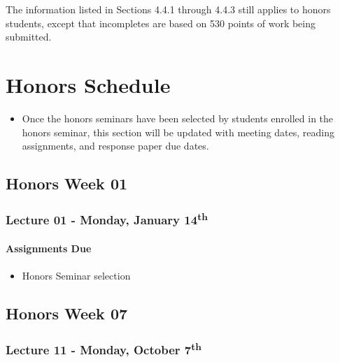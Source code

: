 \documentclass[]{book}
\providecommand{\tightlist}{%
  \setlength{\itemsep}{0pt}\setlength{\parskip}{0pt}}
\newenvironment{rmdblock}[1]
  {\begin{shaded*}
  \begin{itemize}
  \renewcommand{\labelitemi}{
    \raisebox{-.7\height}[0pt][0pt]{
      {\setkeys{Gin}{width=3em,keepaspectratio}\texttt{[image: images/\#1]}}
    }
  }
  \item
  }
  {
  \end{itemize}
  \end{shaded*}
  }
\newenvironment{rmdwarning}
  {\begin{rmdblock}{warning}}
  {\end{rmdblock}}
\begin{document}
The information listed in Sections 4.4.1 through 4.4.3 still applies to honors students, except that incompletes are based on 530 points of work being submitted.

\hypertarget{honors-schedule}{%
\chapter{Honors Schedule}\label{honors-schedule}}

\begin{rmdwarning}
Once the honors seminars have been selected by students enrolled in the
honors seminar, this section will be updated with meeting dates, reading
assignments, and response paper due dates.
\end{rmdwarning}

\hypertarget{honors-week-01}{%
\section*{Honors Week 01}\label{honors-week-01}}

\hypertarget{lecture-01---monday-january-14th}{%
\subsection*{\texorpdfstring{Lecture 01 - Monday, January 14\textsuperscript{th}}{Lecture 01 - Monday, January 14th}}\label{lecture-01---monday-january-14th}}

\hypertarget{assignments-due-6}{%
\subsubsection*{Assignments Due}\label{assignments-due-6}}

\begin{itemize}
\tightlist
\item
  Honors Seminar selection
\end{itemize}

\hypertarget{honors-week-07}{%
\section*{Honors Week 07}\label{honors-week-07}}

\hypertarget{lecture-11---monday-october-7th-1}{%
\subsection*{\texorpdfstring{Lecture 11 - Monday, October 7\textsuperscript{th}}{Lecture 11 - Monday, October 7th}}\label{lecture-11---monday-october-7th-1}}
\end{document}
